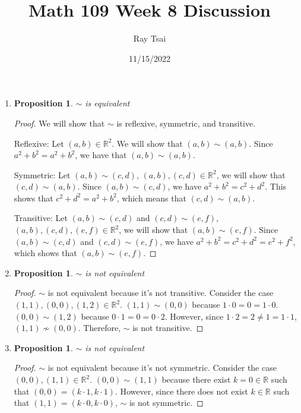 \documentclass{article}
\title{Math 109 Week 8 Discussion}
\author{Ray Tsai}
\date{11/15/2022}
\newtheorem{prop}[thm]{Proposition}
\begin{document}
\maketitle

\begin{enumerate}
\item \begin{prop}
    $\sim$ is equivalent
\end{prop}
\begin{proof}
    We will show that $\sim$ is reflexive, symmetric, and transitive.
    
    Reflexive: Let $(a, b) \in \mathbb{R}^2$. We will show that $(a, b) \sim (a, b)$. Since $a^2 + b^2 = a^2 + b^2$, we have that $(a, b) \sim (a, b)$.

    Symmetric: Let $(a, b) \sim (c, d)$, $(a, b), (c, d) \in \mathbb{R}^2$, we will show that $(c, d) \sim (a, b)$. Since $(a, b) \sim (c, d)$, we have $a^2 + b^2 = c^2+ d^2$. This shows that $c^2 + d^2 = a^2 + b^2$, which means that $(c, d) \sim (a, b)$.

    Transitive: Let $(a, b) \sim (c, d)$ and $(c, d) \sim (e, f)$, $(a, b), (c, d), (e, f) \in \mathbb{R}^2$, we will show that $(a, b) \sim (e, f)$. Since $(a, b) \sim (c, d)$ and $(c, d) \sim (e, f)$, we have $a^2 + b^2 = c^2+ d^2 = e^2 + f^2$, which shows that $(a, b) \sim (e, f)$.
\end{proof}

\item \begin{prop}
    $\sim$ is not equivalent
\end{prop}
\begin{proof}
    $\sim$ is not equivalent because it's not transitive. Consider the case $(1, 1), (0, 0), (1, 2) \in \mathbb{R}^2$. $(1, 1) \sim (0, 0)$ because $1\cdot0 = 0 = 1\cdot0$. $(0, 0) \sim (1, 2)$ because $0\cdot1 = 0 = 0\cdot2$. However, since $1\cdot2 = 2 \neq 1 = 1\cdot1$, $(1, 1) \not\sim (0, 0)$. Therefore, $\sim$ is not transitive.
\end{proof}

\item \begin{prop}
    $\sim$ is not equivalent
\end{prop}
\begin{proof}
    $\sim$ is not equivalent because it's not symmetric. Consider the case $(0, 0), (1, 1) \in \mathbb{R}^2$. $(0, 0) \sim (1, 1)$ because there exist $k = 0 \in \mathbb{R}$ such that $(0, 0) = (k\cdot1, k\cdot1)$. However, since there does not exist $k \in \mathbb{R}$ such that $(1, 1) = (k\cdot0, k\cdot0)$, $\sim$ is not symmetric.
\end{proof}

\end{enumerate}
\end{document}
